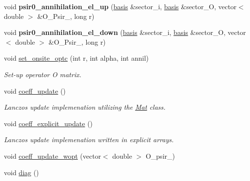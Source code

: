 \begin{DoxyCompactItemize}
\item 
void {\bfseries psir0\+\_\+annihilation\+\_\+el\+\_\+up} (\hyperlink{classbasis}{basis} \&sector\+\_\+i, \hyperlink{classbasis}{basis} \&sector\+\_\+O, vector$<$ double $>$ \&O\+\_\+\+Psir\+\_, long r)\hypertarget{classlhamil_a221f7496d72322c8a602e8458f950701}{}\label{classlhamil_a221f7496d72322c8a602e8458f950701}

\item 
void {\bfseries psir0\+\_\+annihilation\+\_\+el\+\_\+down} (\hyperlink{classbasis}{basis} \&sector\+\_\+i, \hyperlink{classbasis}{basis} \&sector\+\_\+O, vector$<$ double $>$ \&O\+\_\+\+Psir\+\_, long r)\hypertarget{classlhamil_aeb0a40a3d327745b15babd8e221a1caf}{}\label{classlhamil_aeb0a40a3d327745b15babd8e221a1caf}

\item 
void \hyperlink{classlhamil_a08c5ae8976b11b4673259d7b5e09ebcb}{set\+\_\+onsite\+\_\+optc} (int r, int alpha, int annil)\hypertarget{classlhamil_a08c5ae8976b11b4673259d7b5e09ebcb}{}\label{classlhamil_a08c5ae8976b11b4673259d7b5e09ebcb}

\begin{DoxyCompactList}\small\item\em Set-\/up operator O matrix. \end{DoxyCompactList}\item 
void \hyperlink{classlhamil_a57ef80505dfd7819444cc86e0f37b640}{coeff\+\_\+update} ()\hypertarget{classlhamil_a57ef80505dfd7819444cc86e0f37b640}{}\label{classlhamil_a57ef80505dfd7819444cc86e0f37b640}

\begin{DoxyCompactList}\small\item\em Lanczos update implemenation utilizing the \hyperlink{classMat}{Mat} class. \end{DoxyCompactList}\item 
void \hyperlink{classlhamil_a747a5dbb742049be4057c3094fd1dffd}{coeff\+\_\+explicit\+\_\+update} ()\hypertarget{classlhamil_a747a5dbb742049be4057c3094fd1dffd}{}\label{classlhamil_a747a5dbb742049be4057c3094fd1dffd}

\begin{DoxyCompactList}\small\item\em Lanczos update implemenation written in explicit arrays. \end{DoxyCompactList}\item 
void \hyperlink{classlhamil_a0f6c80dc2b5c0f260d6d095751b1a252}{coeff\+\_\+update\+\_\+wopt} (vector$<$ double $>$ O\+\_\+psir\+\_)
\item 
void \hyperlink{classlhamil_ac9af1b00fc91983e100669171b02b708}{diag} ()\hypertarget{classlhamil_ac9af1b00fc91983e100669171b02b708}{}\label{classlhamil_ac9af1b00fc91983e100669171b02b708}


\end{DoxyCompactItemize}
